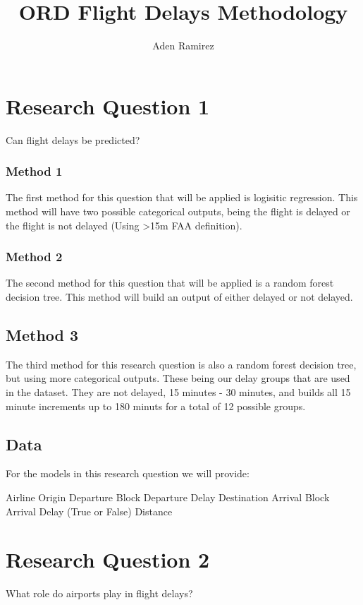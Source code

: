 \documentclass[a4paper,12pt]{article}
\begin{document}
\title{ORD Flight Delays Methodology}
\author{Aden Ramirez}
\maketitle

\pagebreak

\section{Research Question 1}
Can flight delays be predicted?

\subsubsection{Method 1}

The first method for this question that will be applied is logisitic regression. This method will have two possible categorical outputs, being the flight is delayed
or the flight is not delayed (Using >15m FAA definition).

\subsubsection{Method 2}
The second method for this question that will be applied is a random forest decision tree. This method will build an output of either delayed or not delayed.

\subsection{Method 3}
The third method for this research question is also a random forest decision tree, but using more categorical outputs. These being our delay groups that are used in the dataset. They are not delayed, 15 minutes - 30 minutes, and builds all 15 minute increments
up to 180 minuts for a total of 12 possible groups. 

\subsection{Data}
For the models in this research question we will provide:

Airline
Origin
Departure Block
Departure Delay
Destination
Arrival Block
Arrival Delay (True or False)
Distance 

\section{Research Question 2}
What role do airports play in flight delays?
\end{document}

